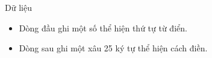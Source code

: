 Dữ liệu
\begin{itemize}
	\item Dòng đầu ghi một số thể hiện thứ tự từ điển.
	\item Dòng sau ghi một xâu 25 ký tự thể hiện cách điền.
\end{itemize}